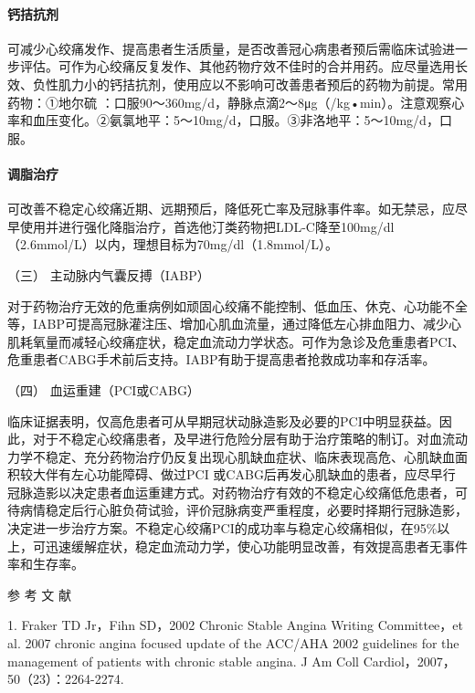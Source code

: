 \paragraph{钙拮抗剂}

可减少心绞痛发作、提高患者生活质量，是否改善冠心病患者预后需临床试验进一步评估。可作为心绞痛反复发作、其他药物疗效不佳时的合并用药。应尽量选用长效、负性肌力小的钙拮抗剂，使用应以不影响可改善患者预后的药物为前提。常用药物：①地尔硫{}
：口服90～360mg/d，静脉点滴2～8μg（/kg•min）。注意观察心率和血压变化。②氨氯地平：5～10mg/d，口服。③非洛地平：5～10mg/d，口服。

\paragraph{调脂治疗}

可改善不稳定心绞痛近期、远期预后，降低死亡率及冠脉事件率。如无禁忌，应尽早使用并进行强化降脂治疗，首选他汀类药物把LDL-C降至100mg/dl
（2.6mmol/L）以内，理想目标为70mg/dl（1.8mmol/L）。

\hypertarget{text00309.htmlux5cux23CHP10-7-3-2-3}{}
（三） 主动脉内气囊反搏（IABP）

对于药物治疗无效的危重病例如顽固心绞痛不能控制、低血压、休克、心功能不全等，IABP可提高冠脉灌注压、增加心肌血流量，通过降低左心排血阻力、减少心肌耗氧量而减轻心绞痛症状，稳定血流动力学状态。可作为急诊及危重患者PCI、危重患者CABG手术前后支持。IABP有助于提高患者抢救成功率和存活率。

\hypertarget{text00309.htmlux5cux23CHP10-7-3-2-4}{}
（四） 血运重建（PCI或CABG）

临床证据表明，仅高危患者可从早期冠状动脉造影及必要的PCI中明显获益。因此，对于不稳定心绞痛患者，及早进行危险分层有助于治疗策略的制订。对血流动力学不稳定、充分药物治疗仍反复出现心肌缺血症状、临床表现高危、心肌缺血面积较大伴有左心功能障碍、做过PCI
或CABG后再发心肌缺血的患者，应尽早行冠脉造影以决定患者血运重建方式。对药物治疗有效的不稳定心绞痛低危患者，可待病情稳定后行心脏负荷试验，评价冠脉病变严重程度，必要时择期行冠脉造影，决定进一步治疗方案。不稳定心绞痛PCI的成功率与稳定心绞痛相似，在95\%以上，可迅速缓解症状，稳定血流动力学，使心功能明显改善，有效提高患者无事件率和生存率。

\protect\hypertarget{text00310.html}{}{}

\hypertarget{text00310.htmlux5cux23CHP10-7-4}{}
参 考 文 献

1. Fraker TD Jr，Fihn SD，2002 Chronic Stable Angina Writing
Committee，et al. 2007 chronic angina focused update of the ACC/AHA 2002
guidelines for the management of patients with chronic stable angina. J
Am Coll Cardiol，2007，50（23）：2264-2274.

